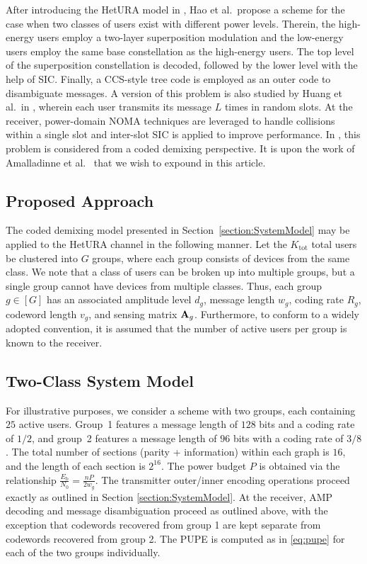 \documentclass[journal]{IEEEtran}
\begin{document}
After introducing the HetURA model in \cite{hao2020exploration}, Hao et al.\ propose a scheme for the case when two classes of users exist with different power levels. 
Therein, the high-energy users employ a two-layer superposition modulation and the low-energy users employ the same base constellation as the high-energy users.
The top level of the superposition constellation is decoded, followed by the lower level with the help of SIC.
Finally, a CCS-style tree code is employed as an outer code to disambiguate messages. 
A version of this problem is also studied by Huang et al.\ in \cite{huang2021iterative}, wherein each user transmits its message $L$ times in random slots.  
At the receiver, power-domain NOMA techniques are leveraged to handle collisions within a single slot and inter-slot SIC is applied to improve performance.  
In \cite{amalladinne2020multiclass}, this problem is considered from a coded demixing perspective. 
It is upon the work of Amalladinne et al.~\cite{amalladinne2020multiclass} that we wish to expound in this article. 

\subsection{Proposed Approach}

The coded demixing model presented in Section~\ref{section:SystemModel} may be applied to the HetURA channel in the following manner.  
Let the $K_{\mathrm{tot}}$ total users be clustered into $G$ groups, where each group consists of devices from the same class.
We note that a class of users can be broken up into multiple groups, but a single group cannot have devices from multiple classes. 
Thus, each group $g \in [G]$ has an associated amplitude level $d_g$, message length $w_g$, coding rate $R_g$, codeword length $v_g$, and sensing matrix $\mathbf{A}_g$.
Furthermore, to conform to a widely adopted convention, it is assumed that the number of active users per group is known to the receiver.

\subsection{Two-Class System Model}

For illustrative purposes, we consider a scheme with two groups, each containing $25$ active users.
Group~1 features a message length of $128$ bits and a coding rate of $1/2$, and group~2 features a message length of $96$ bits with a coding rate of $3/8$. 
The total number of sections (parity + information) within each graph is $16$, and the length of each section is $2^{16}$. 
The power budget $P$ is obtained via the relationship $\frac{E_{\mathrm{b}}}{N_0} = \frac{nP}{2w_g}$. 
The transmitter outer/inner encoding operations proceed exactly as outlined in Section \ref{section:SystemModel}.
At the receiver, AMP decoding and message disambiguation proceed as outlined above, with the exception that codewords recovered from group 1 are kept separate from codewords recovered from group 2. 
The PUPE is computed as in \eqref{eq:pupe} for each of the two groups individually.  
\end{document}
